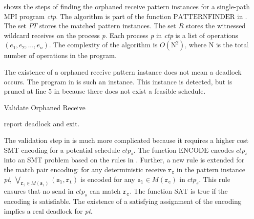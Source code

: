  shows the steps of finding the orphaned receive pattern instances for a single-path MPI program \textit{ctp}. The algorithm is part of the function $\mathrm{PATTERNFINDER}$ in . 
The set $\mathit{PT}$ stores the matched pattern instances.
The set $\mathit{R}$ stores the witnessed wildcard receives on the process \textit{p}. 
Each process \textit{p} in \textit{ctp} is a list of operations $(e_1, e_2, \dots, e_n)$. 
The complexity of the algorithm is $O(\mathrm{N}^2)$, where $\mathrm{N}$ is the total number of operations in the program. 



\examplefigtwo

The existence of a orphaned receive pattern instance does not mean a deadlock occurs. The program in  is such an instance. This instance is detected, but is pruned at line 5 in  because there does not exist a feasible schedule.

\begin{algorithm}
\caption{Validate Orphaned Receive}\label{algo:vorphaned}
\begin{algorithmic}[1]
\State report deadlock and exit.
\EndIf
\end{algorithmic}
\end{algorithm}

The validation step in  is much more complicated because it requires a higher cost SMT encoding for a potential schedule $\mathit{ctp_s}$. 
The function $\mathrm{ENCODE}$ encodes $\mathit{ctp_s}$ into an SMT problem based on the rules in \cite{DBLP:conf/kbse/HuangMM13}. Further, a new rule is extended for the match pair encoding: for any deterministic receive $\mathtt{r_c}$ in the pattern instance \textit{pt}, $\bigvee_{\mathtt{r_i}\in\mathit{M}(\mathtt{s_l})}(\mathtt{s_l},\mathtt{r_i})$ is encoded for any $\mathtt{s_l}\in\mathit{M}(\mathtt{r_c})$ in $\mathit{ctp_s}$. This rule ensures that no send in $\mathit{ctp_s}$ can match $\mathtt{r_c}$. The function $\mathrm{SAT}$ is true if the encoding is satisfiable. The existence of a satisfying assignment of the encoding implies a real deadlock for \textit{pt}. 

